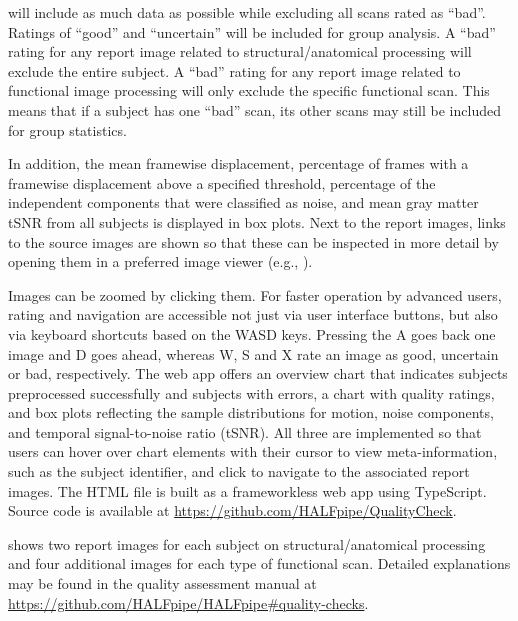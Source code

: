  will include as much data as possible while excluding all scans rated as ``bad''. Ratings of ``good'' and ``uncertain'' will be included for group analysis. A ``bad'' rating for any report image related to structural/anatomical processing will exclude the entire subject. A ``bad'' rating for any report image related to functional image processing will only exclude the specific functional scan. This means that if a subject has one ``bad'' scan, its other scans may still be included for group statistics.

In addition, the mean framewise displacement, percentage of frames with a framewise displacement above a specified threshold, percentage of the independent components that were classified as noise, and mean gray matter tSNR from all subjects is displayed in box plots. Next to the report images, links to the source images are shown so that these can be inspected in more detail by opening them in a preferred image viewer (e.g., ).

Images can be zoomed by clicking them. For faster operation by advanced users, rating and navigation are accessible not just via user interface buttons, but also via keyboard shortcuts based on the WASD keys. Pressing the A goes back one image and D goes ahead, whereas W, S and X rate an image as good, uncertain or bad, respectively. The web app offers an overview chart that indicates subjects preprocessed successfully and subjects with errors, a chart with quality ratings, and box plots reflecting the sample distributions for motion, noise components, and temporal signal-to-noise ratio (tSNR). All three are implemented so that users can hover over chart elements with their cursor to view meta-information, such as the subject identifier, and click to navigate to the associated report images. The HTML file is built as a frameworkless web app using TypeScript. Source code is available at \url{https://github.com/HALFpipe/QualityCheck}.

 shows two report images for each subject on structural/anatomical processing and four additional images for each type of functional scan. Detailed explanations may be found in the quality assessment manual at \url{https://github.com/HALFpipe/HALFpipe#quality-checks}.

